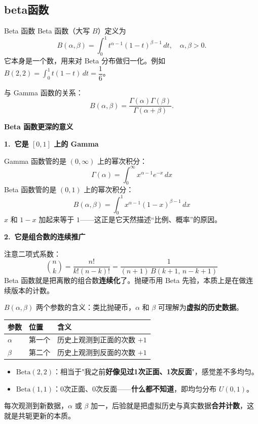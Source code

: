 \subsection{beta函数}
\begin{definition}{Beta 函数}{}
Beta 函数（大写 $B$）定义为
\[
B(\alpha,\beta) = \int_0^1 t^{\alpha-1}(1-t)^{\beta-1}\,dt, \quad \alpha,\beta>0.
\]
它本身是一个数，用来对 Beta 分布做归一化。例如
$B(2,2)=\int_0^1 t(1-t)\,dt=\dfrac{1}{6}$。

与 Gamma 函数的关系：
\[
B(\alpha,\beta)=\frac{\Gamma(\alpha)\Gamma(\beta)}{\Gamma(\alpha+\beta)}.
\]
\end{definition}
\begin{note}
\textbf{Beta 函数更深的意义}

\textbf{1.~它是 $[0,1]$ 上的 Gamma}

Gamma 函数管的是 $(0,\infty)$ 上的幂次积分：
\[
\Gamma(\alpha) = \int_0^\infty x^{\alpha-1}e^{-x}\,dx
\]
Beta 函数管的是 $(0,1)$ 上的幂次积分：
\[
B(\alpha,\beta) = \int_0^1 x^{\alpha-1}(1-x)^{\beta-1}\,dx
\]
$x$ 和 $1-x$ 加起来等于 $1$——这正是它天然描述``比例、概率''的原因。

\textbf{2.~它是组合数的连续推广}

注意二项式系数：
\[
\binom{n}{k} = \frac{n!}{k!(n-k)!} = \frac{1}{(n+1)\,B(k+1,\,n-k+1)}
\]
Beta 函数就是把离散的组合数\textbf{连续化}了。抛硬币用 Beta 先验，本质上是在做连续版本的计数。
\end{note}
\begin{dxtips}
$B(\alpha,\beta)$ 两个参数的含义：类比抛硬币，$\alpha$ 和 $\beta$ 可理解为\textbf{虚拟的历史数据}。

\begin{center}
\begin{tabular}{lll}
\toprule
\textbf{参数} & \textbf{位置} & \textbf{含义} \\
\midrule
$\alpha$ & 第一个 & 历史上观测到正面的次数 $+1$ \\
$\beta$  & 第二个 & 历史上观测到反面的次数 $+1$ \\
\bottomrule
\end{tabular}
\end{center}

\begin{itemize}
    \item $\mathrm{Beta}(2,2)$：相当于"我之前\textbf{好像见过1次正面、1次反面}"，感觉差不多均匀。
    \item $\mathrm{Beta}(1,1)$：0次正面、0次反面——\textbf{什么都不知道}，即均匀分布 $U(0,1)$。
\end{itemize}

每次观测到新数据，$\alpha$ 或 $\beta$ 加一，后验就是把虚拟历史与真实数据\textbf{合并计数}，这就是共轭更新的本质。
\end{dxtips}
